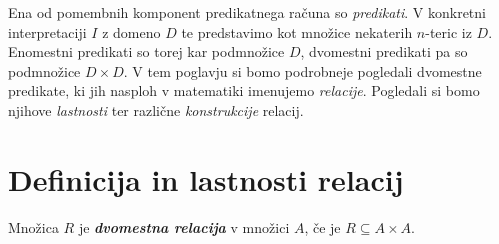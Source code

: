 \documentclass[11pt]{book}
\def\definicija{\color{rdeca}\bf\em}
\theoremstyle{definition}
\theoremstyle{zgled}
\theoremstyle{odprtproblem}
\theoremstyle{domacanaloga}
\theoremstyle{izrek}
\begin{document}
Ena od pomembnih komponent predikatnega računa so \emph{predikati}. V konkretni interpretaciji $I$ z domeno $D$ te predstavimo kot množice nekaterih $n$-teric iz $D$. Enomestni predikati so torej kar podmnožice $D$, dvomestni predikati pa so podmnožice $D \times D$. V tem poglavju si bomo podrobneje pogledali dvomestne predikate, ki jih nasploh v matematiki imenujemo \emph{relacije}. Pogledali si bomo njihove \emph{lastnosti} ter različne \emph{konstrukcije} relacij.

\section{Definicija in lastnosti relacij}

Množica $R$ je {\definicija dvomestna relacija} v množici $A$, če je $R \subseteq A \times A$.
\end{document}
